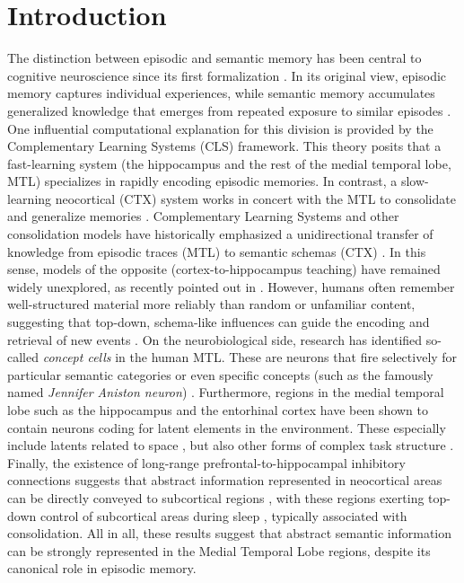 \documentclass{article}
\begin{document}
\section*{Introduction}
The distinction between episodic and semantic memory has been central to cognitive neuroscience since its first formalization . In its original view, episodic memory captures individual experiences, while semantic memory accumulates generalized knowledge that emerges from repeated exposure to similar episodes . One influential computational explanation for this division is provided by the Complementary Learning Systems (CLS) framework. This theory posits that a fast-learning system (the hippocampus and the rest of the medial temporal lobe, MTL) specializes in rapidly encoding episodic memories. In contrast, a slow-learning neocortical (CTX) system works in concert with the MTL to consolidate and generalize memories .
\newline\newline
Complementary Learning Systems and other consolidation models have historically emphasized a unidirectional transfer of knowledge from episodic traces (MTL) to semantic schemas (CTX) . In this sense, models of the opposite (cortex-to-hippocampus teaching) have remained widely unexplored, as recently pointed out in . However, humans often remember well-structured material more reliably than random or unfamiliar content, suggesting that top-down, schema-like influences can guide the encoding and retrieval of new events . On the neurobiological side, research has identified so-called \textit{concept cells} in the human MTL. These are neurons that fire selectively for particular semantic categories or even specific concepts (such as the famously named \textit{Jennifer Aniston neuron}) . Furthermore, regions in the medial temporal lobe such as the hippocampus and the entorhinal cortex have been shown to contain neurons coding for latent elements in the environment. These especially include latents related to space , but also other forms of complex task structure . Finally, the existence of long-range prefrontal-to-hippocampal inhibitory connections suggests that abstract information represented in neocortical areas can be directly conveyed to subcortical regions , with these regions exerting top-down control of subcortical areas during sleep , typically associated with consolidation. All in all, these results suggest that abstract semantic information can be strongly represented in the Medial Temporal Lobe regions, despite its canonical role in episodic memory.
\end{document}
